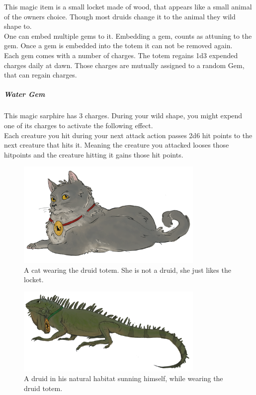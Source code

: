 \documentclass[letter,10pt,twocolumn,openany]{dndbook}
\begin{document}

This magic item is a small locket made of wood, that appears like a small animal of the owners choice. Though most druids change it to the animal they wild shape to.\\
One can embed multiple gems to it. Embedding a gem, counts as attuning to the gem. Once a gem is embedded into the totem it can not be removed again.\\

Each gem comes with a number of charges.
The totem regains 1d3 expended charges daily at dawn.
Those charges are mutually assigned to a random Gem, that can regain charges.\\

\subparagraph{Water Gem} This magic sarphire has 3 charges. During your wild shape, you might expend one of its charges to activate the following effect.\\
Each creature you hit during your next attack action passes 2d6 hit points to the next creature that hits it. Meaning the creature you attacked looses those hitpoints and the creature hitting it gains those hit points.\\

\begin{figure}
    \includegraphics[width=9cm]{images/cat.png}
    \caption{A cat wearing the druid totem. She is not a druid, she just likes the locket.}
\end{figure}

\begin{figure}
    \includegraphics[width=9cm]{images/iguana.png}
    \caption{A druid in his natural habitat sunning himself, while wearing the druid totem.}
\end{figure}
\end{document}
